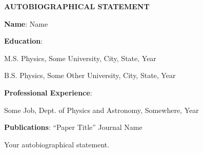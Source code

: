 

\begin{center}

\textbf{AUTOBIOGRAPHICAL STATEMENT}
\end{center}
\noindent
\textbf{Name}:
\noindent
Name
\singlespacing

\noindent
\textbf{Education}:

\noindent
M.S. Physics, Some University, City, State, Year

\noindent
B.S. Physics, Some Other University, City, State, Year

\noindent
\textbf{Professional Experience}:

\noindent
Some Job, Dept. of Physics and Astronomy, Somewhere, Year

\noindent
\textbf{Publications}: ``Paper Title'' Journal Name

\singlespacing
Your autobiographical statement.